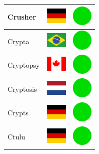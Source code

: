 \documentclass[12pt, a4paper, twoside]{report}
\begin{document}
\begin{center}
\begin{longtable}{|p{5cm}|p{2cm}|p{2cm}|}
 Crusher                                                    & \includegraphics[width=1cm]{../img/flags/de} &   \includegraphics[width=1cm]{../likes/y} \\ \hline
 Crypta                                                     & \includegraphics[width=1cm]{../img/flags/br} &   \includegraphics[width=1cm]{../likes/y} \\ \hline
 Cryptopsy                                                  & \includegraphics[width=1cm]{../img/flags/ca} &   \includegraphics[width=1cm]{../likes/y} \\ \hline
 Cryptosis                                                  & \includegraphics[width=1cm]{../img/flags/nl} &   \includegraphics[width=1cm]{../likes/y} \\ \hline
 Crypts                                                     & \includegraphics[width=1cm]{../img/flags/de} &   \includegraphics[width=1cm]{../likes/y} \\ \hline
 Ctulu                                                      & \includegraphics[width=1cm]{../img/flags/de} &   \includegraphics[width=1cm]{../likes/y} \\ \hline

\end{longtable}
\end{center}
\end{document}
